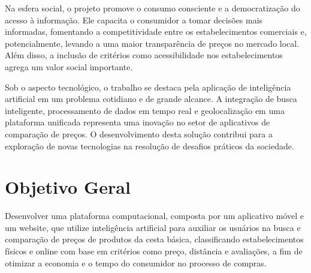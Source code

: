 \documentclass[
  article,
  a4paper,
  12pt,
  oneside,
  fleqn
]{abntex2}
\begin{document}
Na esfera social, o projeto promove o consumo consciente e a democratização do acesso à informação. Ele capacita o consumidor a tomar decisões mais informadas, fomentando a competitividade entre os estabelecimentos comerciais e, potencialmente, levando a uma maior transparência de preços no mercado local. Além disso, a inclusão de critérios como acessibilidade nos estabelecimentos agrega um valor social importante.

Sob o aspecto tecnológico, o trabalho se destaca pela aplicação de inteligência artificial em um problema cotidiano e de grande alcance. A integração de busca inteligente, processamento de dados em tempo real e geolocalização em uma plataforma unificada representa uma inovação no setor de aplicativos de comparação de preços. O desenvolvimento desta solução contribui para a exploração de novas tecnologias na resolução de desafios práticos da sociedade.

\section{Objetivo Geral}

Desenvolver uma plataforma computacional, composta por um aplicativo móvel e um website, que utilize inteligência artificial para auxiliar os usuários na busca e comparação de preços de produtos da cesta básica, classificando estabelecimentos físicos e online com base em critérios como preço, distância e avaliações, a fim de otimizar a economia e o tempo do consumidor no processo de compras.

\postextual
\printbibliography
\end{document}
